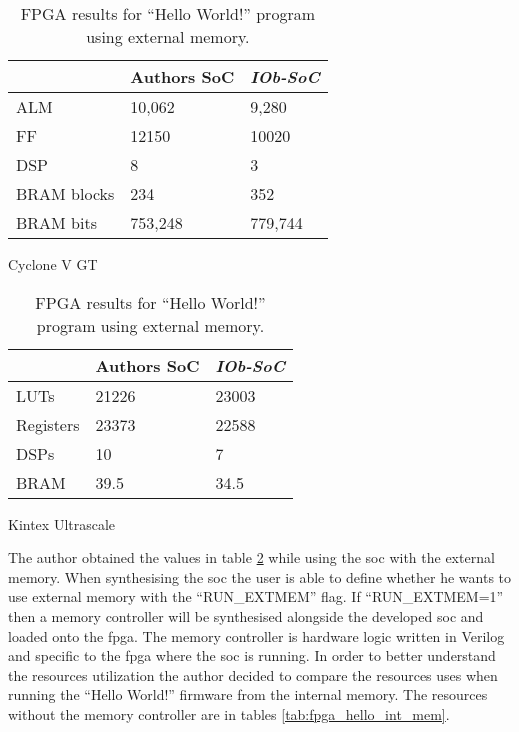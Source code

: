 \begin{table}[h]
    \begin{subtable}[h]{0.45\textwidth}
        \centering
        \begin{tabular}{l|l|l|}
            \cline{2-3}
                                              & Authors SoC & \textit{IOb-SoC} \\ \hline
            \multicolumn{1}{|l|}{ALM}         & 10,062      & 9,280            \\ \hline
            \multicolumn{1}{|l|}{FF}          & 12150       & 10020            \\ \hline
            \multicolumn{1}{|l|}{DSP}         & 8           & 3                \\ \hline
            \multicolumn{1}{|l|}{BRAM blocks} & 234         & 352              \\ \hline
            \multicolumn{1}{|l|}{BRAM bits}   & 753,248     & 779,744          \\ \hline
        \end{tabular}
       \caption{Cyclone V GT}
       \label{tab:cyclone_hello}
    \end{subtable}
    \hfill
    \begin{subtable}[h]{0.45\textwidth}
        \centering
        \begin{tabular}{l|l|l|}
            \cline{2-3}
                                            & Authors SoC & \textit{IOb-SoC} \\ \hline
            \multicolumn{1}{|l|}{LUTs}      & 21226       & 23003            \\ \hline
            \multicolumn{1}{|l|}{Registers} & 23373       & 22588            \\ \hline
            \multicolumn{1}{|l|}{DSPs}      & 10          & 7                \\ \hline
            \multicolumn{1}{|l|}{BRAM}      & 39.5        & 34.5             \\ \hline
        \end{tabular}
        \caption{Kintex Ultrascale}
        \label{tab:kintex_hello}
     \end{subtable}
     \caption{FPGA results for \enquote{Hello World!} program using external memory.}
     \label{tab:fpga_hello}
\end{table}

The author obtained the values in table \ref{tab:fpga_hello} while using the \acrshort{soc} with the external memory. When synthesising the \acrshort{soc} the user is able to define whether he wants to use external memory with the \enquote{RUN\_EXTMEM} flag. If \enquote{RUN\_EXTMEM=1} then a memory controller will be synthesised alongside the developed \acrshort{soc} and loaded onto the \acrshort{fpga}. The memory controller is hardware logic written in Verilog and specific to the \acrshort{fpga} where the \acrshort{soc} is running. In order to better understand the resources utilization the author decided to compare the resources uses when running the \enquote{Hello World!} firmware from the internal memory. The resources without the memory controller are in tables \ref{tab:fpga_hello_int_mem}.

